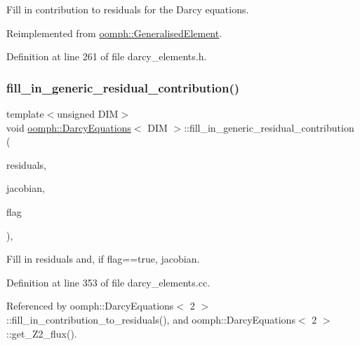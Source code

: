 Fill in contribution to residuals for the Darcy equations. 



Reimplemented from \hyperlink{classoomph_1_1GeneralisedElement_a310c97f515e8504a48179c0e72c550d7}{oomph\+::\+Generalised\+Element}.



Definition at line 261 of file darcy\+\_\+elements.\+h.

\mbox{\label{classoomph_1_1DarcyEquations_a3ca52cedfaf3579f2854c3f9b57de622}} 
\subsubsection{\texorpdfstring{fill\+\_\+in\+\_\+generic\+\_\+residual\+\_\+contribution()}{fill\_in\_generic\_residual\_contribution()}}
{\footnotesize\ttfamily template$<$unsigned D\+IM$>$ \\
void \hyperlink{classoomph_1_1DarcyEquations}{oomph\+::\+Darcy\+Equations}$<$ D\+IM $>$\+::fill\+\_\+in\+\_\+generic\+\_\+residual\+\_\+contribution (\begin{DoxyParamCaption}\item[{\hyperlink{classoomph_1_1Vector}{Vector}$<$ double $>$ \&}]{residuals,  }\item[{\hyperlink{classoomph_1_1DenseMatrix}{Dense\+Matrix}$<$ double $>$ \&}]{jacobian,  }\item[{bool}]{flag }\end{DoxyParamCaption})\hspace{0.3cm}{\ttfamily [protected]}, {\ttfamily [virtual]}}



Fill in residuals and, if flag==true, jacobian. 



Definition at line 353 of file darcy\+\_\+elements.\+cc.



Referenced by oomph\+::\+Darcy\+Equations$<$ 2 $>$\+::fill\+\_\+in\+\_\+contribution\+\_\+to\+\_\+residuals(), and oomph\+::\+Darcy\+Equations$<$ 2 $>$\+::get\+\_\+\+Z2\+\_\+flux().

